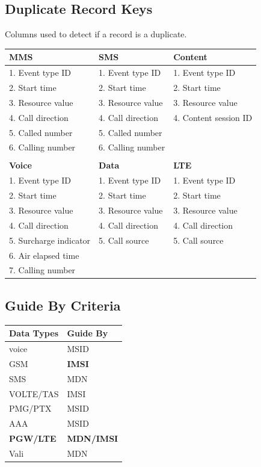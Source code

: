 \documentclass[12pt,twoside]{article}
\begin{document}
\subsection{Duplicate Record Keys}
\label{sec:orgheadline25}
Columns used to detect if a record is a duplicate.
\small
\begin{center}
\begin{tabular}{lll}
\hline
\textbf{MMS} & \textbf{SMS} & \textbf{Content}\\
\hline
1. Event type ID & 1. Event type ID & 1. Event type ID\\
2. Start time & 2. Start time & 2. Start time\\
3. Resource value & 3. Resource value & 3. Resource value\\
4. Call direction & 4. Call direction & 4. Content session ID\\
5. Called number & 5. Called number & \\
6. Calling number & 6. Calling number & \\
&  & \\
\hline
\textbf{Voice} & \textbf{Data} & \textbf{LTE}\\
\hline
1. Event type ID & 1. Event type ID & 1. Event type ID\\
2. Start time & 2. Start time & 2. Start time\\
3. Resource value & 3. Resource value & 3. Resource value\\
4. Call direction & 4. Call direction & 4. Call direction\\
5. Surcharge indicator & 5. Call source & 5. Call source\\
6. Air elapsed time &  & \\
7. Calling number &  & \\
\hline
\end{tabular}
\end{center}

\normalsize
\subsection{Guide By Criteria}
\label{sec:orgheadline26}

\begin{center}
\begin{tabular}{ll}
\hline
\textbf{Data Types} & \textbf{Guide By}\\
\hline
voice & MSID\\
GSM & \textbf{IMSI}\\
SMS & MDN\\
VOLTE/TAS & IMSI\\
PMG/PTX & MSID\\
AAA & MSID\\
\textbf{PGW/LTE} & \textbf{MDN/IMSI}\\
Vali & MDN\\
\hline
\end{tabular}
\end{center}
\end{document}
